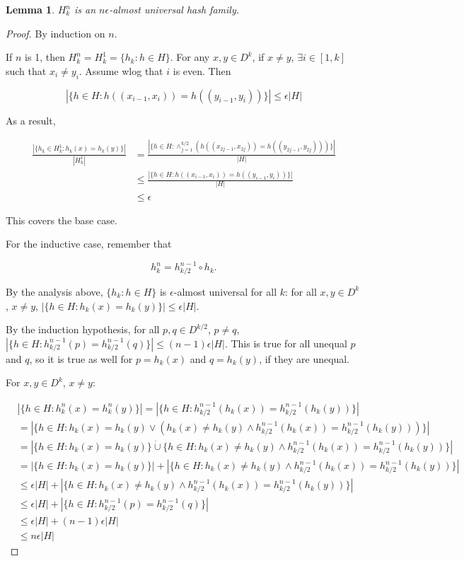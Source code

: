 \documentclass{letter}
\newtheorem{Lemma}{Lemma}
\begin{document}
\begin{Lemma}
$H^n_k$ is an $n\epsilon$-almost universal hash family.
\end{Lemma}
\begin{proof}
By induction on $n$.

If $n$ is 1, then $H^n_k = H^1_k = \{h_k : h \in H\}$.
For any $x,y \in D^k$, if $x \neq y$, $\exists i \in [1,k]$ such that $x_i \neq y_i$.
Assume wlog that $i$ is even.
Then 

$$
|\{h \in H : h((x_{i-1},x_i)) = h((y_{i-1},y_i))\}| \leq \epsilon |H|
$$

As a result, 

\begin{align*}
\frac{|\{h_k \in H^1_k : h_k(x) = h_k(y)\}|}{|H^1_k|} &=
\frac{|\{h \in H : \land_{j=1}^{k/2} (h((x_{2j-1},x_{2j})) = h((y_{2j-1},y_{2j})))\}|}{|H|}\\
&\leq \frac{|\{h \in H : h((x_{i-1},x_i)) = h((y_{i-1},y_i))\}|}{|H|}\\
&\leq \epsilon
\end{align*}

This covers the base case.

For the inductive case, remember that

$$
h^n_k = h^{n-1}_{k/2} \circ h_k.
$$

By the analysis above, $\{h_k : h \in H\}$ is $\epsilon$-almost universal for all $k$: for all $x,y \in D^k$, $x \neq y$, $|\{h \in H : h_k(x) = h_k(y)\}| \leq \epsilon |H|$.

By the induction hypothesis, for all $p,q \in D^{k/2}$, $p \neq q$, $|\{h \in H : h^{n-1}_{k/2}(p) = h^{n-1}_{k/2}(q)\}| \leq (n-1)\epsilon |H|$. 
This is true for all unequal $p$ and $q$, so it is true as well for $p = h_k(x)$ and $q = h_k(y)$, if they are unequal.

For $x,y \in D^k$, $x \neq y$:

\begin{align*}
&|\{h \in H : h^n_k(x) = h^n_k(y)\}| = |\{h \in H : h^{n-1}_{k/2}(h_k(x)) = h^{n-1}_{k/2}(h_k(y))\}| \\
&= |\{h \in H : h_k(x) = h_k(y) \lor (h_k(x) \neq h_k(y) \land h^{n-1}_{k/2}(h_k(x)) = h^{n-1}_{k/2}(h_k(y)))\}| \\
&= |\{h \in H : h_k(x) = h_k(y)\} \dot{\cup} \{h \in H : h_k(x) \neq h_k(y) \land h^{n-1}_{k/2}(h_k(x)) = h^{n-1}_{k/2}(h_k(y))\}| \\
&= |\{h \in H : h_k(x) = h_k(y)\}| + |\{h \in H : h_k(x) \neq h_k(y) \land h^{n-1}_{k/2}(h_k(x)) = h^{n-1}_{k/2}(h_k(y))\}| \\
&\leq \epsilon |H| + |\{h \in H : h_k(x) \neq h_k(y) \land h^{n-1}_{k/2}(h_k(x)) = h^{n-1}_{k/2}(h_k(y))\}| \\
&\leq \epsilon |H| + |\{h \in H : h^{n-1}_{k/2}(p) = h^{n-1}_{k/2}(q)\}| \\
&\leq \epsilon |H| + (n-1) \epsilon |H|\\
&\leq n \epsilon |H|
\end{align*}

\end{proof}
\end{document}
